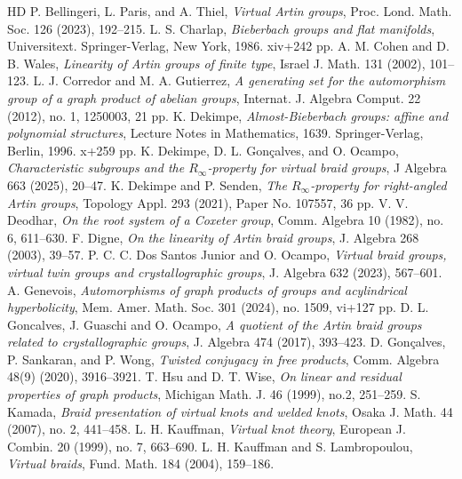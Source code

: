 \documentclass[12pt]{amsart}
\numberwithin{equation}{section}
\begin{document}
\begin{thebibliography}{HD}
 P. Bellingeri, L. Paris, and A. Thiel, {\it Virtual Artin groups}, Proc. Lond. Math. Soc. 126 (2023), 192--215.
 L. S. Charlap,  {\it Bieberbach groups and flat manifolds}, Universitext. Springer-Verlag, New York, 1986. xiv+242 pp.
 A. M. Cohen and D. B. Wales, {\it Linearity of Artin groups of finite type}, Israel J. Math. 131 (2002), 101--123.
  L. J. Corredor and M. A. Gutierrez, {\it A generating set for the automorphism group of a graph product of abelian groups}, Internat. J. Algebra Comput.   22 (2012), no. 1, 1250003, 21 pp.
 K. Dekimpe, {\it Almost-Bieberbach groups: affine and polynomial structures}, Lecture Notes in Mathematics, 1639. Springer-Verlag, Berlin, 1996. x+259 pp.
  K. Dekimpe, D. L. Gon\c calves, and O. Ocampo, {\it Characteristic subgroups and the $R_\infty$-property for virtual braid groups}, J Algebra  663 (2025), 20--47.
 K. Dekimpe and P. Senden, {\it The $R_\infty$-property for right-angled Artin groups}, Topology Appl.   293 (2021), Paper No. 107557, 36 pp.
 V. V. Deodhar, {\it On the root system of a Coxeter group}, Comm. Algebra 10 (1982), no. 6, 611--630.
 F. Digne, {\it On the linearity of Artin braid groups}, J. Algebra 268 (2003), 39--57.
 P. C. C. Dos Santos Junior and O. Ocampo, {\it Virtual braid groups, virtual twin groups and crystallographic groups}, J. Algebra 632 (2023), 567--601.
 A. Genevois, {\it Automorphisms of graph products of groups and acylindrical hyperbolicity}, Mem. Amer. Math. Soc.   301 (2024), no. 1509, vi+127 pp.
 D. L. Goncalves, J.  Guaschi and O. Ocampo,  {\it A quotient of the Artin braid groups related to crystallographic groups}, J. Algebra 474 (2017), 393--423.
  D. Gon\c calves, P. Sankaran, and P. Wong, {\it Twisted conjugacy in free products}, Comm. Algebra 48(9) (2020), 3916--3921.
 T. Hsu and D. T. Wise, {\it On linear and residual properties of graph products}, Michigan Math. J. 46 (1999), no.2, 251--259.
 S. Kamada, {\it Braid presentation of virtual knots and welded knots}, Osaka J. Math. 44 (2007), no. 2, 441--458.
 L. H. Kauffman, {\it Virtual knot theory}, European J. Combin. 20 (1999), no. 7, 663--690.
 L. H. Kauffman and S. Lambropoulou,   {\it Virtual braids}, Fund. Math. 184 (2004), 159--186.

\end{thebibliography}
\end{document}
